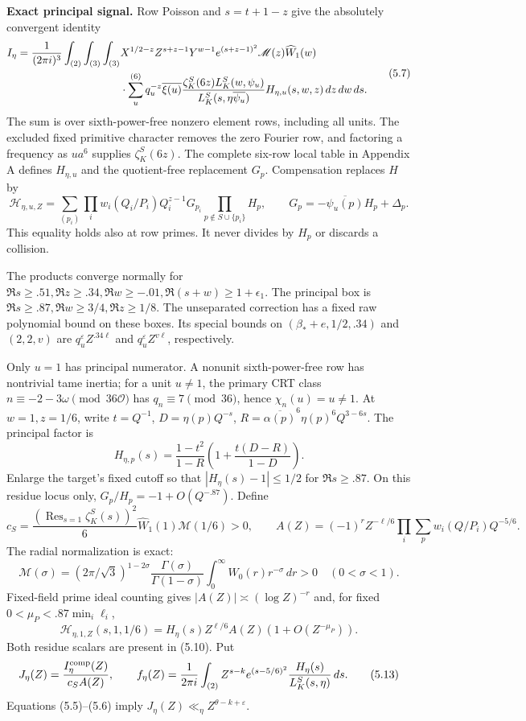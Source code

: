 \documentclass[11pt,a4paper]{article}
\begin{document}
\textbf{Exact principal signal.} Row Poisson and \(s=t+1-z\) give the
absolutely convergent identity \[
\begin{split}
I_\eta={1\over(2\pi i)^3}\int_{(2)}\int_{(3)}\int_{(3)}
&X^{1/2-z}Z^{s+z-1}Y^{w-1}e^{(s+z-1)^2}
\mathscr M(z)\widehat W_1(w)\\
&\cdot\sum_u^{(6)}q_u^{-z}\overline{\xi(u)}
\frac{\zeta_K^S(6z)L_K^S(w,\psi_u)}
 {L_K^S(s,\eta\overline{\psi_u})}H_{\eta,u}(s,w,z)
\,dz\,dw\,ds .
\end{split}
\tag{5.7}
\] The sum is over sixth-power-free nonzero element rows, including all
units. The excluded fixed primitive character removes the zero Fourier
row, and factoring a frequency as \(ua^6\) supplies \(\zeta_K^S(6z)\).
The complete six-row local table in Appendix A defines \(H_{\eta,u}\)
and the quotient-free replacement \(G_p\). Compensation replaces \(H\)
by \[
\mathcal H_{\eta,u,Z}
=\sum_{(p_i)}\prod_i w_i(Q_i/P_i)Q_i^{z-1}G_{p_i}
 \prod_{p\notin S\cup\{p_i\}}H_p,\qquad
G_p=-\overline{\psi_u(p)}H_p+\Delta_p.
\tag{5.8}
\] This equality holds also at row primes. It never divides by \(H_p\)
or discards a collision.

The products converge normally for
\(\Re s\ge.51,\Re z\ge.34,\Re w\ge-.01,\Re(s+w)\ge1+\epsilon_1\). The
principal box is \(\Re s\ge.87,\Re w\ge3/4,\Re z\ge1/8\). The
unseparated correction has a fixed raw polynomial bound on these boxes.
Its special bounds on \((\beta_*+e,1/2,.34)\) and \((2,2,v)\) are
\(q_u^\varepsilon Z^{.34\ell}\) and \(q_u^\varepsilon Z^{v\ell}\),
respectively.

Only \(u=1\) has principal numerator. A nonunit sixth-power-free row has
nontrivial tame inertia; for a unit \(u\ne1\), the primary CRT class
\(n\equiv-2-3\omega\pmod{36\mathcal O}\) has \(q_n\equiv7\pmod{36}\),
hence \(\chi_n(u)=u\ne1\). At \(w=1,z=1/6\), write \(t=Q^{-1}\),
\(D=\eta(p)Q^{-s}\), \(R=\overline{\alpha(p)}^6\eta(p)^6Q^{3-6s}\). The
principal factor is \[
H_{\eta,p}(s)=\frac{1-t^2}{1-R}
 \left(1+\frac{t(D-R)}{1-D}\right).
\tag{5.9}
\] Enlarge the target's fixed cutoff so that \(|H_\eta(s)-1|\le1/2\) for
\(\Re s\ge.87\). On this residue locus only, \(G_p/H_p=-1+O(Q^{-.87})\).
Define \[
c_S=\frac{(\operatorname{Res}_{s=1}\zeta_K^S(s))^2}{6}
 \widehat W_1(1)\mathscr M(1/6)>0,\qquad
A(Z)=(-1)^rZ^{-\ell/6}
 \prod_i\sum_p w_i(Q/P_i)Q^{-5/6}.
\tag{5.10}
\] The radial normalization is exact: \[
\mathscr M(\sigma)=
(2\pi/\sqrt3)^{1-2\sigma}\frac{\Gamma(\sigma)}{\Gamma(1-\sigma)}
\int_0^\infty W_0(r)r^{-\sigma}\,dr>0
\quad(0<\sigma<1).
\tag{5.11}
\] Fixed-field prime ideal counting gives \(|A(Z)|\asymp(\log Z)^{-r}\)
and, for fixed \(0<\mu_P<.87\min_i\ell_i\), \[
\mathcal H_{\eta,1,Z}(s,1,1/6)
=H_\eta(s)Z^{\ell/6}A(Z)(1+O(Z^{-\mu_P})).
\tag{5.12}
\] Both residue scalars are present in (5.10). Put \[
J_\eta(Z)=\frac{I_\eta^{\rm comp}(Z)}{c_S A(Z)},\qquad
f_\eta(Z)=\frac1{2\pi i}\int_{(2)}
 Z^{s-k}e^{(s-5/6)^2}\frac{H_\eta(s)}{L_K^S(s,\eta)}\,ds.
\tag{5.13}
\] Equations (5.5)--(5.6) imply
\(J_\eta(Z)\ll_\eta Z^{\theta-k+\varepsilon}\).
\end{document}
